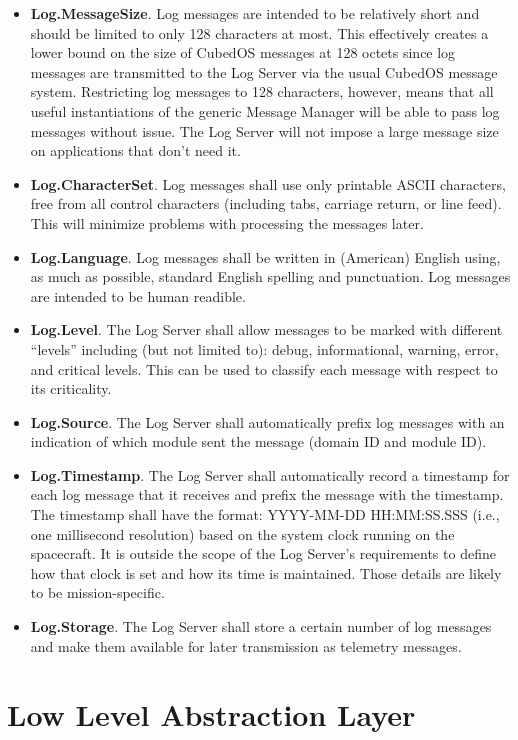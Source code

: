 \begin{itemize}
  \item \textbf{Log.MessageSize}. Log messages are intended to be relatively short and should be
    limited to only 128 characters at most. This effectively creates a lower bound on the size
    of CubedOS messages at 128 octets since log messages are transmitted to the Log Server via
    the usual CubedOS message system. Restricting log messages to 128 characters, however, means
    that all useful instantiations of the generic Message Manager will be able to pass log
    messages without issue. The Log Server will not impose a large message size on applications
    that don't need it.
  \item \textbf{Log.CharacterSet}. Log messages shall use only printable ASCII characters, free
    from all control characters (including tabs, carriage return, or line feed). This will
    minimize problems with processing the messages later.
  \item \textbf{Log.Language}. Log messages shall be written in (American) English using, as
    much as possible, standard English spelling and punctuation. Log messages are intended to be
    human readible.
  \item \textbf{Log.Level}. The Log Server shall allow messages to be marked with different
    ``levels'' including (but not limited to): debug, informational, warning, error, and
    critical levels. This can be used to classify each message with respect to its criticality.
  \item \textbf{Log.Source}. The Log Server shall automatically prefix log messages with an
    indication of which module sent the message (domain ID and module ID).
  \item \textbf{Log.Timestamp}. The Log Server shall automatically record a timestamp for each
    log message that it receives and prefix the message with the timestamp. The timestamp shall
    have the format: YYYY-MM-DD HH:MM:SS.SSS (i.e., one millisecond resolution) based on the
    system clock running on the spacecraft. It is outside the scope of the Log Server's
    requirements to define how that clock is set and how its time is maintained. Those details
    are likely to be mission-specific.
  \item \textbf{Log.Storage}. The Log Server shall store a certain number of log messages and
    make them available for later transmission as telemetry messages. 
\end{itemize}

\section{Low Level Abstraction Layer}
\label{sec:llal}

